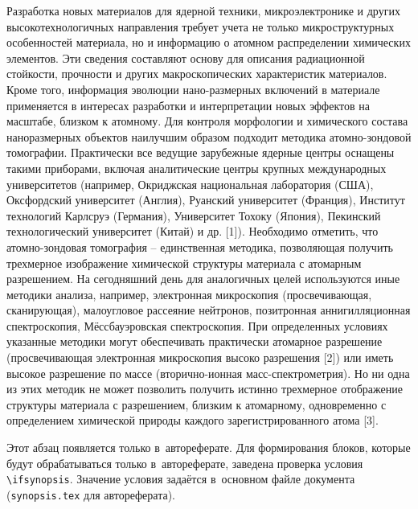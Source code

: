 
{\actuality} Разработка новых материалов для ядерной техники, микроэлектронике и других высокотехнологичных направления требует учета не только микроструктурных особенностей материала, но и информацию о атомном распределении химических элементов. Эти сведения составляют основу для описания радиационной стойкости, прочности и других макроскопических характеристик материалов. Кроме того, информация эволюции нано-размерных включений в материале применяется в интересах разработки и интерпретации новых эффектов на масштабе, близком к атомному.
Для контроля морфологии и химического состава наноразмерных объектов наилучшим образом подходит методика атомно-зондовой томографии. Практически все ведущие зарубежные ядерные центры оснащены такими приборами, включая аналитические центры крупных международных университетов (например, Окриджская национальная лаборатория (США), Оксфордский университет (Англия), Руанский университет (Франция), Институт технологий Карлсруэ (Германия), Университет Тохоку (Япония), Пекинский технологический университет (Китай) и др. [1]). Необходимо отметить, что атомно-зондовая томография – единственная методика, позволяющая получить трехмерное изображение химической структуры материала с атомарным разрешением. На сегодняшний день для аналогичных целей используются иные методики анализа, например, электронная микроскопия (просвечивающая, сканирующая), малоугловое рассеяние нейтронов, позитронная аннигилляционная спектроскопия, Мёссбауэровская спектроскопия. При определенных условиях указанные методики могут обеспечивать практически атомарное разрешение (просвечивающая электронная микроскопия высоко разрешения [2]) или иметь высокое разрешение по массе (вторично-ионная масс-спектрометрия). Но ни одна из этих методик не может позволить получить истинно трехмерное отображение структуры материала с разрешением, близким к атомарному, одновременно с определением химической природы каждого зарегистрированного атома [3].


\ifsynopsis
Этот абзац появляется только в~автореферате.
Для формирования блоков, которые будут обрабатываться только в~автореферате,
заведена проверка условия \verb!\!\verb!ifsynopsis!.
Значение условия задаётся в~основном файле документа (\verb!synopsis.tex! для
автореферата).
\else
\fi


